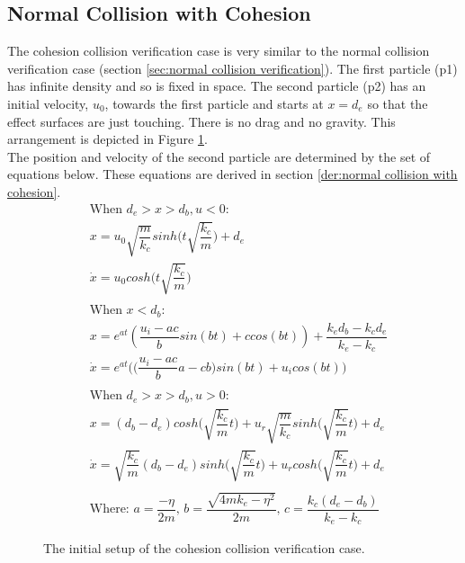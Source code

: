 \documentclass[10pt,a4paper,titlepage]{report}
\begin{document}
\subsection{Normal Collision with Cohesion}
The cohesion collision verification case is very similar to the normal collision verification case (section \ref{sec:normal collision verification}). The first particle (p1) has infinite density and so is fixed in space. The second particle (p2) has an initial velocity, $u_0$, towards the first particle and starts at $x = d_e$ so that the effect surfaces are just touching. There is no drag and no gravity. This arrangement is depicted in Figure \ref{fig:cohesion collision}.
\\The position and velocity of the second particle are determined by the set of equations below. These equations are derived in section \ref{der:normal collision with cohesion}.
\begin{align}
&\text{When $d_e > x > d_b, u < 0$:} \nonumber \\
&x = u_0 \sqrt{\dfrac{m}{k_c}} sinh\Big(t\sqrt{\dfrac{k_c}{m}}\Big) + d_e \\
&\dot{x} = u_0 cos h\Big(t\sqrt{\dfrac{k_c}{m}}\Big) \\ \nonumber \\
&\text{When $x < d_b$:} \nonumber \\
&x = e^{at} (\dfrac{u_i - ac}{b} sin(bt) + c cos (bt)) + \dfrac{k_e d_b - k_c d_e}{k_e - k_c} \\
&\dot{x} = e^{at}\Big(\Big(\dfrac{u_i - ac}{b} a - c b\Big)sin(bt) + u_i cos(bt)\Big) \\ \nonumber \\
&\text{When $d_e > x > d_b, u > 0$:} \nonumber \\
&x = (d_b - d_e)cosh\Big(\sqrt{\dfrac{k_c}{m}} t\Big) + u_r \sqrt{\dfrac{m}{k_c}} sinh\Big(\sqrt{\dfrac{k_c}{m}}t\Big) + d_e \\
&\dot{x} = \sqrt{\dfrac{k_c}{m}}(d_b - d_e)sinh\Big(\sqrt{\dfrac{k_c}{m}} t\Big) + u_r cosh\Big(\sqrt{\dfrac{k_c}{m}}t\Big) + d_e \\ \nonumber \\
&\text{Where: } a = \dfrac{-\eta}{2m} \text{,    } b = \dfrac{\sqrt{4mk_e - \eta ^ 2}}{2m} \text{,    } c = \dfrac{k_c (d_e - d_b)}{k_e - k_c} \nonumber
\end{align}
\begin{figure}[!ht]
\centering

\caption{The initial setup of the cohesion collision verification case.}
\label{fig:cohesion collision}
\end{figure}
\end{document}
